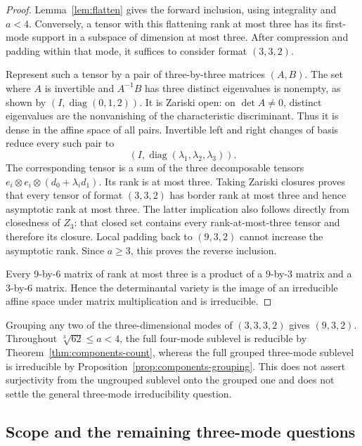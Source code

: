 \begin{proof}
Lemma~\ref{lem:flatten} gives the forward inclusion, using integrality
and $a<4$. Conversely, a tensor with this flattening rank at most three
has its first-mode support in a subspace of dimension at most three.
After compression and padding within that mode, it suffices to consider
format $(3,3,2)$.

Represent such a tensor by a pair of three-by-three matrices $(A,B)$.
The set where $A$ is invertible and $A^{-1}B$ has three distinct
eigenvalues is nonempty, as shown by $(I,\operatorname{diag}(0,1,2))$.
It is Zariski open: on $\det A\ne0$, distinct eigenvalues are the
nonvanishing of the characteristic discriminant. Thus it is dense in
the affine space of all pairs. Invertible left and right changes of
basis reduce every such pair to
\[
                  (I,\operatorname{diag}(\lambda_1,\lambda_2,\lambda_3)).
\]
The corresponding tensor is a sum of the three decomposable tensors
$e_i\otimes e_i\otimes(d_0+\lambda_i d_1)$. Its rank is at most three.
Taking Zariski closures proves that every tensor of format $(3,3,2)$
has border rank at most three and hence asymptotic rank at most three.
The latter implication also follows directly from closedness of $Z_3$:
that closed set contains every rank-at-most-three tensor and therefore
its closure. Local padding back to $(9,3,2)$ cannot increase the
asymptotic rank. Since $a\geq3$, this proves the reverse inclusion.

Every $9$-by-$6$ matrix of rank at most three is a product of a
$9$-by-$3$ matrix and a $3$-by-$6$ matrix. Hence the determinantal
variety is the image of an irreducible affine space under matrix
multiplication and is irreducible.
\end{proof}

Grouping any two of the three-dimensional modes of $(3,3,3,2)$ gives
$(9,3,2)$. Throughout $\sqrt[3]{62}\leq a<4$, the full four-mode
sublevel is reducible by Theorem~\ref{thm:components-count}, whereas
the full grouped three-mode sublevel is irreducible by
Proposition~\ref{prop:components-grouping}. This does not assert
surjectivity from the ungrouped sublevel onto the grouped one and
does not settle the general three-mode irreducibility question.

\subsection{Scope and the remaining three-mode questions}
\label{sec:components-scope}

